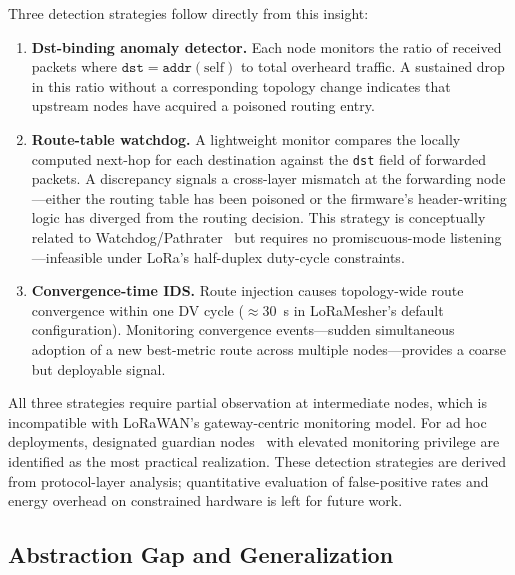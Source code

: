 \documentclass[preprint,12pt]{elsarticle}
\begin{document}
Three detection strategies follow directly from this insight:

\begin{enumerate}

  \item \textbf{Dst-binding anomaly detector.}
  Each node monitors the ratio of received packets where
  $\texttt{dst}=\texttt{addr}(\text{self})$ to total overheard
  traffic. A sustained drop in this ratio without a corresponding
  topology change indicates that upstream nodes have acquired
  a poisoned routing entry.

  \item \textbf{Route-table watchdog.}
  A lightweight monitor compares the locally computed
  next-hop for each destination against the \texttt{dst}
  field of forwarded packets. A discrepancy signals a
  cross-layer mismatch at the forwarding node—either the
  routing table has been poisoned or the firmware's
  header-writing logic has diverged from the routing decision.
  This strategy is conceptually related to Watchdog/Pathrater~\cite{marti2000-watchdog} but requires no promiscuous-mode listening---infeasible under LoRa's half-duplex duty-cycle constraints.

  \item \textbf{Convergence-time IDS.}
  Route injection causes topology-wide route convergence within
  one DV cycle ($\approx$30~s in LoRaMesher's default
  configuration). Monitoring convergence events—sudden
  simultaneous adoption of a new best-metric route across
  multiple nodes—provides a coarse but deployable signal.

\end{enumerate}

All three strategies require partial observation at intermediate
nodes, which is incompatible with LoRaWAN's gateway-centric
monitoring model.
For ad hoc deployments, designated guardian
nodes~\cite{ieee2025-blackhole-optimization} with elevated
monitoring privilege are identified as the most practical
realization.
These detection strategies are derived from protocol-layer
analysis; quantitative evaluation of false-positive rates and
energy overhead on constrained hardware is left for future work.

\subsection{Abstraction Gap and Generalization}
\label{sec:cross-layer-generalization}
\end{document}
